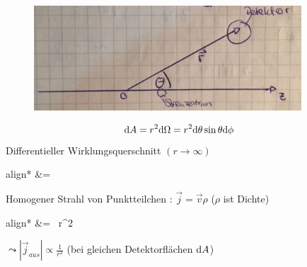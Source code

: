 	\begin{figure} [h]
		\begin{center}
			\includegraphics[width=10cm]{Stat_Streuproblem_Wirkungsquerschnitt3}
		\end{center}
	\end{figure}
		\begin{align*}
			\mathrm{d} A &= r^2 \mathrm{d} \Omega = r^2 \mathrm{d} \theta \sin \theta \mathrm{d} \phi
		\end{align*}
	Differentieller Wirklungsquerschnitt $(r \rightarrow \infty)$
		\begin{empheq}[box=\boxed]{align*}
			\frac{\diff \sigma}{\diff \Omega} &=
			 
		\end{empheq}
	Homogener Strahl von Punktteilchen : $\vec{j} = \vec{v} \rho$ ($\rho$ ist Dichte)
		\begin{empheq}[box=\boxed]{align*}
			\frac{\diff \sigma}{\diff \Omega} &=
			 ~r^2
		\end{empheq}
	$ \leadsto |\vec{j}_{aus}| \propto \frac{1}{r^2}$ (bei gleichen Detektorflächen $\mathrm{d} A$)
	
